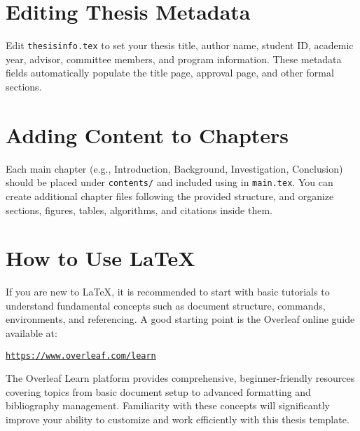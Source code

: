\section{Editing Thesis Metadata}
\begin{paragraph}
Edit \texttt{thesisinfo.tex} to set your thesis title, author name, student ID, academic year, advisor, committee members, and program information. These metadata fields automatically populate the title page, approval page, and other formal sections.
\end{paragraph}

\section{Adding Content to Chapters}
\begin{paragraph}
Each main chapter (e.g., Introduction, Background, Investigation, Conclusion) should be placed under \texttt{contents/} and included using \verb|| in \texttt{main.tex}. You can create additional chapter files following the provided structure, and organize sections, figures, tables, algorithms, and citations inside them.
\end{paragraph}

\section{How to Use {\LaTeX}}
\begin{paragraph}
If you are new to {\LaTeX}, it is recommended to start with basic tutorials to understand fundamental concepts such as document structure, commands, environments, and referencing. A good starting point is the Overleaf online guide available at:

\begin{center}
\href{https://www.overleaf.com/learn}{\texttt{https://www.overleaf.com/learn}}
\end{center}

The Overleaf Learn platform provides comprehensive, beginner-friendly resources covering topics from basic document setup to advanced formatting and bibliography management. Familiarity with these concepts will significantly improve your ability to customize and work efficiently with this thesis template.
\end{paragraph}

